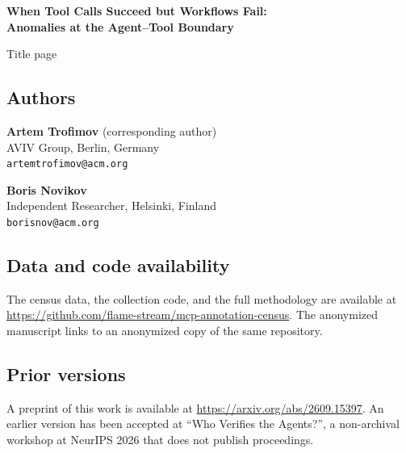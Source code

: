 \documentclass[11pt,a4paper]{article}
\begin{document}
\begin{center}
{\Large\bfseries When Tool Calls Succeed but Workflows Fail:\\
Anomalies at the Agent--Tool Boundary}

\bigskip
Title page
\end{center}

\subsection*{Authors}

\textbf{Artem Trofimov} (corresponding author)\\
AVIV Group, Berlin, Germany\\
\texttt{artemtrofimov@acm.org}

\medskip
\textbf{Boris Novikov}\\
Independent Researcher, Helsinki, Finland\\
\texttt{borisnov@acm.org}

\subsection*{Data and code availability}

The census data, the collection code, and the full methodology are
available at \url{https://github.com/flame-stream/mcp-annotation-census}.
The anonymized manuscript links to an anonymized copy of the same
repository.

\subsection*{Prior versions}

A preprint of this work is available at
\url{https://arxiv.org/abs/2609.15397}. An earlier version has been
accepted at ``Who Verifies the Agents?'', a non-archival workshop at
NeurIPS 2026 that does not publish proceedings.
\end{document}
